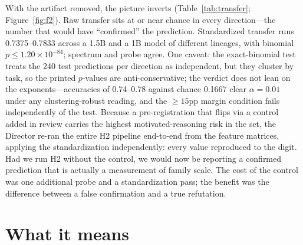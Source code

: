 \documentclass{article}
\begin{document}
With the artifact removed, the picture inverts (Table~\ref{tab:transfer};
Figure~\ref{fig:f2}).
Raw transfer sits at or near chance in every direction---the number that
would have ``confirmed'' the prediction. Standardized transfer runs
0.7375--0.7833 across a 1.5B and a 1B model of different lineages, with
binomial $p \le 1.20\times10^{-84}$; spectrum and probe agree. One caveat:
the exact-binomial test treats the 240 test predictions per direction as
independent, but they cluster by task, so the printed $p$-values are
anti-conservative; the verdict does not lean on the exponents---accuracies
of 0.74--0.78 against chance 0.1667 clear $\alpha = 0.01$ under any
clustering-robust reading, and the $\ge 15$pp margin condition fails
independently of the test. Because a pre-registration that flips via a
control added in review carries the highest motivated-reasoning risk in the
set, the Director re-ran the entire H2 pipeline end-to-end from the feature
matrices, applying the standardization independently: every value
reproduced to the digit. Had we run H2 without the control, we would now be
reporting a confirmed prediction that is actually a measurement of family
scale. The cost of the control was one additional probe and a
standardization pass; the benefit was the difference between a false
confirmation and a true refutation.

\section{What it means}
\label{sec:meaning}
\end{document}
